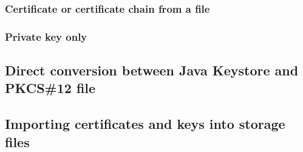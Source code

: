 \documentclass[10pt, a4paper]{report}
\begin{document}
    \subsubsection{Certificate or certificate chain from a file}
    
    \subsubsection{Private key only}
    
  \subsection{Direct conversion between Java Keystore and PKCS\#12 file}
  
  \subsection{Importing certificates and keys into storage files}
  
\end{document}
